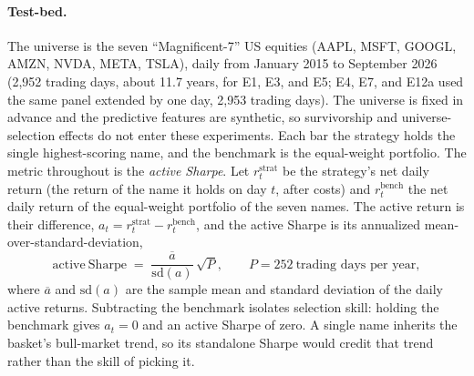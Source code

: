\documentclass[11pt]{article}
\begin{document}
\paragraph{Test-bed.} The universe is the seven ``Magnificent-7'' US equities (AAPL, MSFT, GOOGL,
AMZN, NVDA, META, TSLA), daily from January 2015 to September 2026 (2{,}952 trading days, about 11.7 years, for E1, E3, and E5;
E4, E7, and E12a used the same panel extended by one day, 2{,}953 trading days). The universe is
fixed in advance and the predictive features are synthetic, so survivorship and universe-selection
effects do not enter these experiments. Each bar the strategy holds the single highest-scoring name,
and the benchmark is the equal-weight portfolio. The
metric throughout is the \emph{active Sharpe}. Let $r^{\mathrm{strat}}_t$ be the strategy's net daily
return (the return of the name it holds on day $t$, after costs) and $r^{\mathrm{bench}}_t$ the net daily
return of the equal-weight portfolio of the seven names. The active return is their difference,
$a_t = r^{\mathrm{strat}}_t - r^{\mathrm{bench}}_t$, and the active Sharpe is its annualized
mean-over-standard-deviation,
\begin{equation}
\mathrm{active\ Sharpe} \;=\; \frac{\overline{a}}{\mathrm{sd}(a)}\,\sqrt{P},
\qquad P = 252\ \text{trading days per year},
\label{eq:activesharpe}
\end{equation}
where $\overline{a}$ and $\mathrm{sd}(a)$ are the sample mean and standard deviation of the daily active
returns. Subtracting the benchmark isolates selection skill: holding the benchmark gives $a_t=0$ and an
active Sharpe of zero. A single name inherits the basket's bull-market trend, so its standalone Sharpe
would credit that trend rather than the skill of picking it.
\end{document}
